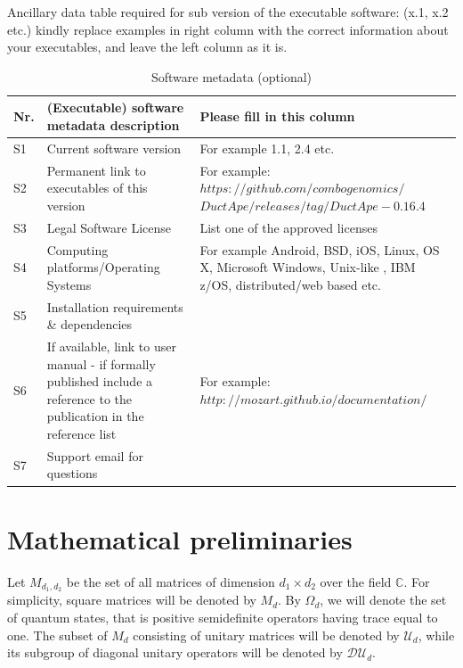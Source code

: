 \documentclass[preprint,12pt, a4paper, dvipsnames]{elsarticle}
\newcommand{\1}{{\rm 1\hspace{-0.9mm}l}}
\newcommand{\DD}{\mathcal{D}}
\newcommand{\UU}{\mathcal{U}}
\newcommand{\HH}{\mathcal{H}}
\begin{document}
Ancillary data table required for sub version of the executable software: (x.1,
x.2 etc.) kindly replace examples in right column with the correct information
about your executables, and leave the left column as it is.

\begin{table}[!h]
\begin{tabular}{|l|p{6.5cm}|p{6.5cm}|}
\hline
\textbf{Nr.} & \textbf{(Executable) software metadata description} &
\textbf{Please fill in this column} \\
\hline
S1 & Current software version & For example 1.1, 2.4 etc. \\
\hline
S2 & Permanent link to executables of this version  & For example:
$https://github.com/combogenomics/$ $DuctApe/releases/tag/DuctApe-0.16.4$ \\
\hline
S3 & Legal Software License & List one of the approved licenses \\
\hline
S4 & Computing platforms/Operating Systems & For example Android, BSD, iOS,
Linux, OS X, Microsoft Windows, Unix-like , IBM z/OS, distributed/web based
etc. \\
\hline
S5 & Installation requirements \& dependencies & \\
\hline
S6 & If available, link to user manual - if formally published include a
reference to the publication in the reference list & For example:
$http://mozart.github.io/documentation/$ \\
\hline
S7 & Support email for questions & \\
\hline
\end{tabular}
\caption{Software metadata (optional)}
\label{}
\end{table}

\appendix
\section{Mathematical preliminaries} \label{app:preliminaries}

Let $M_{d_1,d_2}$ be the set of all matrices of dimension $d_1 \times d_2$ over
the field $\mathbb{C}$. For  simplicity, square matrices will be denoted by
$M_d$.
By $\Omega_d$, we will denote the set of quantum states, that is
positive semidefinite operators having trace equal to one.
The subset of $M_d$ consisting of unitary matrices will be denoted
by $\UU_d$, while its subgroup of diagonal unitary operators will be denoted by
$\DD \UU_d$.
\end{document}
